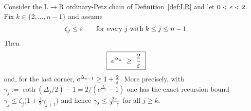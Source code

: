 \documentclass[11pt]{article}
\theoremstyle{definition}\newtheorem{example}[theorem]{Example}
\begin{document}
\begin{theorem}\label{thm:sep}
Consider the L$\to$R ordinary-Petz chain of Definition~\ref{def:LR} and let
$0<\varepsilon<2$.  Fix $k\in\{2,\dots,n-1\}$ and assume
\begin{equation}\label{eq:allweak}
 \zeta_j\le\varepsilon\qquad\text{for every }j\ \text{with}\ k\le j\le n-1 .
\end{equation}
Then
\begin{equation}\label{eq:sep}
 \boxed{\ e^{\Delta_k}\ \ge\ \frac2{\varepsilon}\ }
\end{equation}
and, for the last corner, $e^{\Delta_{n-1}}\ge1+\frac2{\varepsilon}$.  More precisely, with
$\gamma_j:=\coth(\Delta_j/2)-1=2/(e^{\Delta_j}-1)$ one has the exact recursion bound
$\gamma_j\le\zeta_j\bigl(1+\tfrac12\gamma_{j+1}\bigr)$ and hence
$\gamma_j\le\frac{2\varepsilon}{2-\varepsilon}$ for all $j\ge k$.
\end{theorem}
\end{document}
